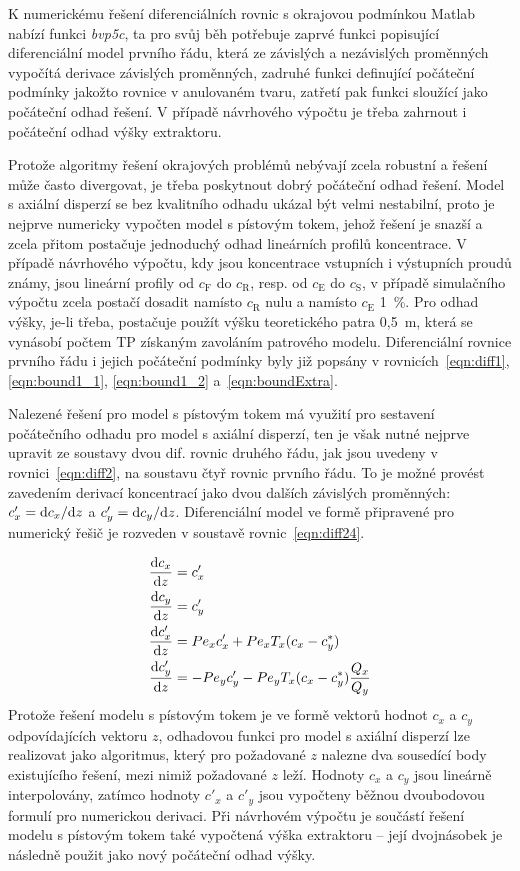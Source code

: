K numerickému řešení diferenciálních rovnic s okrajovou podmínkou Matlab nabízí funkci \textit{bvp5c}, ta pro svůj běh potřebuje zaprvé funkci popisující diferenciální model prvního řádu, která ze závislých a nezávislých proměnných vypočítá derivace závislých proměnných, zadruhé funkci definující počáteční podmínky jakožto rovnice v anulovaném tvaru, zatřetí pak funkci sloužící jako počáteční odhad řešení.
V případě návrhového výpočtu je třeba zahrnout i počáteční odhad výšky extraktoru.

Protože algoritmy řešení okrajových problémů nebývají zcela robustní a řešení může často divergovat, je třeba poskytnout dobrý počáteční odhad řešení.
Model s axiální disperzí se bez kvalitního odhadu ukázal být velmi nestabilní, proto je nejprve numericky vypočten model s pístovým tokem, jehož řešení je snazší a zcela přitom postačuje jednoduchý odhad lineárních profilů koncentrace.
V případě návrhového výpočtu, kdy jsou koncentrace vstupních i výstupních proudů známy, jsou lineární profily od $c_\mathrm{F}$ do $c_\mathrm{R}$, resp. od $c_\mathrm{E}$ do $c_\mathrm{S}$, v případě simulačního výpočtu zcela postačí dosadit namísto $c_\mathrm{R}$ nulu a namísto $c_\mathrm{E}$ 1~\%.
Pro odhad výšky, je-li třeba, postačuje použít výšku teoretického patra 0,5~m, která se vynásobí počtem TP získaným zavoláním patrového modelu.
Diferenciální rovnice prvního řádu i jejich počáteční podmínky byly již popsány v rovnicích~\ref{eqn:diff1}, \ref{eqn:bound1_1}, \ref{eqn:bound1_2} a~\ref{eqn:boundExtra}.

Nalezené řešení pro model s pístovým tokem má využití pro sestavení počátečního odhadu pro model s axiální disperzí, ten je však nutné nejprve upravit ze soustavy dvou dif. rovnic druhého řádu, jak jsou uvedeny v rovnici~\ref{eqn:diff2}, na soustavu čtyř rovnic prvního řádu.
To je možné provést zavedením derivací koncentrací jako dvou dalších závislých proměnných: $c'_x = \mathrm{d} c_x / \mathrm{d} z$ a $c'_y = \mathrm{d} c_y / \mathrm{d} z$.
Diferenciální model ve formě připravené pro numerický řešič je rozveden v soustavě rovnic~\ref{eqn:diff24}.

\begin{align}
\label{eqn:diff24}
	\frac{\mathrm{d} c_x}{\mathrm{d} z} &= c'_x \\
	\frac{\mathrm{d} c_y}{\mathrm{d} z} &= c'_y \nonumber \\
	\frac{\mathrm{d} c'_x}{\mathrm{d} z} &=  Pe_x c'_x + Pe_x T_x (c_x - c_y^*) \nonumber \\
	\frac{\mathrm{d} c'_y}{\mathrm{d} z} &= -Pe_y c'_y - Pe_y T_x (c_x - c_y^*) \frac{Q_x}{Q_y} \nonumber
\end{align}
Protože řešení modelu s pístovým tokem je ve formě vektorů hodnot $c_x$ a $c_y$ odpovídajících vektoru $z$, odhadovou funkci pro model s axiální disperzí lze realizovat jako algoritmus, který pro požadované $z$ nalezne dva sousedící body existujícího řešení, mezi nimiž požadované $z$ leží.
Hodnoty $c_x$ a $c_y$ jsou lineárně interpolovány, zatímco hodnoty $c'_x$ a $c'_y$ jsou vypočteny běžnou dvoubodovou formulí pro numerickou derivaci.
Při návrhovém výpočtu je součástí řešení modelu s pístovým tokem také vypočtená výška extraktoru -- její dvojnásobek je následně použit jako nový počáteční odhad výšky.

